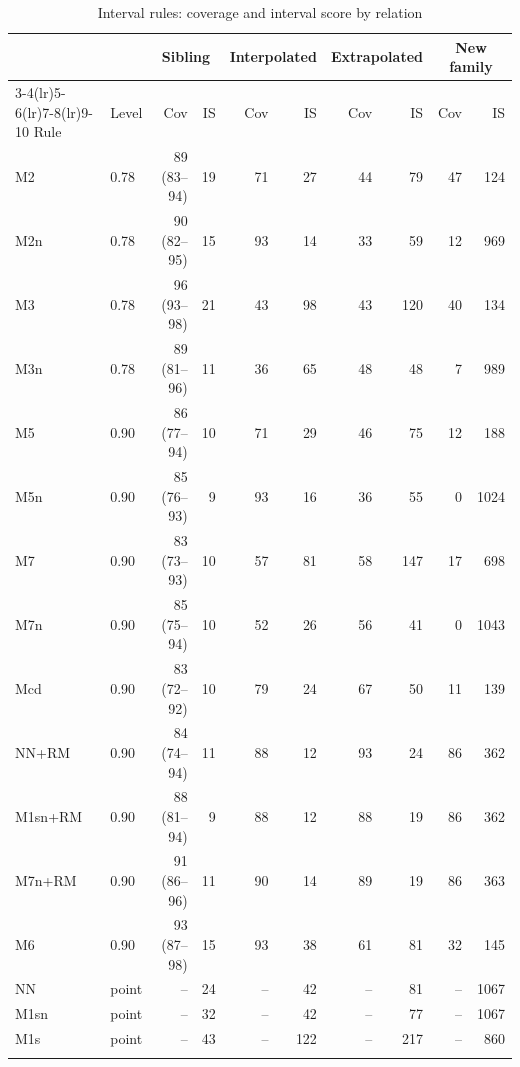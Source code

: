 \documentclass[pdflatex,sn-basic]{sn-jnl}
\newcommand{\tabsizesmall}{\footnotesize}
\begin{document}
\begin{table}[p]
\tabsizesmall
\setlength{\tabcolsep}{3pt}
\caption{Interval rules: coverage and interval score by relation}\label{tab:s-coverage}
\begin{tabular}{@{}llrrrrrrrr@{}}
\toprule
 & & \multicolumn{2}{c}{Sibling} & \multicolumn{2}{c}{Interpolated} & \multicolumn{2}{c}{Extrapolated} & \multicolumn{2}{c}{New family} \\
\cmidrule(lr){3-4}\cmidrule(lr){5-6}\cmidrule(lr){7-8}\cmidrule(lr){9-10}
Rule & Level & Cov & IS & Cov & IS & Cov & IS & Cov & IS \\
\midrule
M2 & 0.78 & 89 (83--94) & 19 & 71 & 27 & 44 & 79 & 47 & 124 \\
M2n & 0.78 & 90 (82--95) & 15 & 93 & 14 & 33 & 59 & 12 & 969 \\
M3 & 0.78 & 96 (93--98) & 21 & 43 & 98 & 43 & 120 & 40 & 134 \\
M3n & 0.78 & 89 (81--96) & 11 & 36 & 65 & 48 & 48 & 7 & 989 \\
M5 & 0.90 & 86 (77--94) & 10 & 71 & 29 & 46 & 75 & 12 & 188 \\
M5n & 0.90 & 85 (76--93) & 9 & 93 & 16 & 36 & 55 & 0 & 1024 \\
M7 & 0.90 & 83 (73--93) & 10 & 57 & 81 & 58 & 147 & 17 & 698 \\
M7n & 0.90 & 85 (75--94) & 10 & 52 & 26 & 56 & 41 & 0 & 1043 \\
Mcd & 0.90 & 83 (72--92) & 10 & 79 & 24 & 67 & 50 & 11 & 139 \\
NN+RM & 0.90 & 84 (74--94) & 11 & 88 & 12 & 93 & 24 & 86 & 362 \\
M1sn+RM & 0.90 & 88 (81--94) & 9 & 88 & 12 & 88 & 19 & 86 & 362 \\
M7n+RM & 0.90 & 91 (86--96) & 11 & 90 & 14 & 89 & 19 & 86 & 363 \\
M6 & 0.90 & 93 (87--98) & 15 & 93 & 38 & 61 & 81 & 32 & 145 \\
NN & point & -- & 24 & -- & 42 & -- & 81 & -- & 1067 \\
M1sn & point & -- & 32 & -- & 42 & -- & 77 & -- & 1067 \\
M1s & point & -- & 43 & -- & 122 & -- & 217 & -- & 860 \\
\botrule
\end{tabular}
\end{table}
\end{document}
